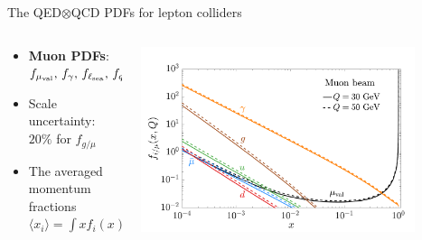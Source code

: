\documentclass[aspectratio=169]{beamer}
\begin{document}
\begin{frame}{The QED$\otimes$QCD PDFs for lepton colliders}
\begin{columns}
		\begin{column}{0.65\textwidth}
			\begin{itemize}
				\item \textcolor{PittRoyal}{\bf Muon PDFs}: $f_{\mu_{\rm val}},\, f_\gamma,\, f_{\ell_{\rm sea}},\, f_q,\, f_g$
				\item Scale uncertainty: $20\%$ for $f_{g/\mu}$
				\item The averaged momentum fractions $\langle x_i\rangle=\int xf_i(x)\dd x$
				\begin{table}[tb]
				\end{table}
			\end{itemize}
		\end{column}
		\begin{column}{0.45\textwidth}
			\includegraphics[width=0.85\textwidth]{figs/QECDm}
		\end{column}
	\end{columns}
\end{frame}
\end{document}
